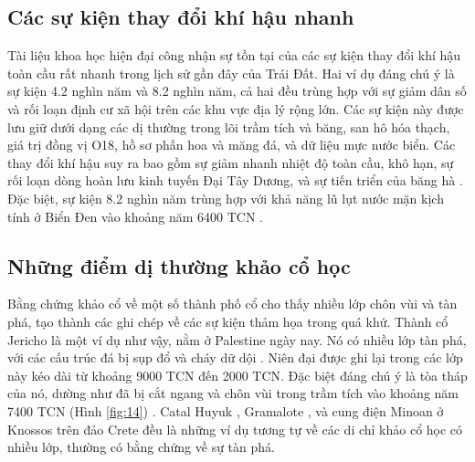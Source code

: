 \documentclass[10pt,twocolumn,letterpaper]{article}
\begin{document}
\subsection{Các sự kiện thay đổi khí hậu nhanh}

Tài liệu khoa học hiện đại công nhận sự tồn tại của các sự kiện thay đổi khí hậu toàn cầu rất nhanh trong lịch sử gần đây của Trái Đất. Hai ví dụ đáng chú ý là sự kiện 4.2 nghìn năm và 8.2 nghìn năm, cả hai đều trùng hợp với sự giảm dân số và rối loạn định cư xã hội trên các khu vực địa lý rộng lớn. Các sự kiện này được lưu giữ dưới dạng các dị thường trong lõi trầm tích và băng, san hô hóa thạch, giá trị đồng vị O18, hồ sơ phấn hoa và măng đá, và dữ liệu mực nước biển. Các thay đổi khí hậu suy ra bao gồm sự giảm nhanh nhiệt độ toàn cầu, khô hạn, sự rối loạn dòng hoàn lưu kinh tuyến Đại Tây Dương, và sự tiến triển của băng hà \cite{90,91,92}. Đặc biệt, sự kiện 8.2 nghìn năm trùng hợp với khả năng lũ lụt nước mặn kịch tính ở Biển Đen vào khoảng năm 6400 TCN \cite{93}.

\subsection{Những điểm dị thường khảo cổ học}

Bằng chứng khảo cổ về một số thành phố cổ cho thấy nhiều lớp chôn vùi và tàn phá, tạo thành các ghi chép về các sự kiện thảm họa trong quá khứ. Thành cổ Jericho là một ví dụ như vậy, nằm ở Palestine ngày nay. Nó có nhiều lớp tàn phá, với các cấu trúc đá bị sụp đổ và cháy dữ dội \cite{96,97}. Niên đại được ghi lại trong các lớp này kéo dài từ khoảng 9000 TCN đến 2000 TCN. Đặc biệt đáng chú ý là tòa tháp của nó, dường như đã bị cắt ngang và chôn vùi trong trầm tích vào khoảng năm 7400 TCN (Hình \ref{fig:14}) \cite{95}. Catal Huyuk \cite{99}, Gramalote \cite{98}, và cung điện Minoan ở Knossos trên đảo Crete \cite{100,101} đều là những ví dụ tương tự về các di chỉ khảo cổ học có nhiều lớp, thường có bằng chứng về sự tàn phá.
\end{document}
